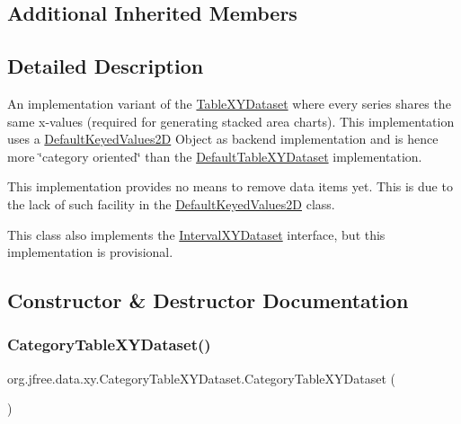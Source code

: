 \subsection*{Additional Inherited Members}


\subsection{Detailed Description}
An implementation variant of the \mbox{\hyperlink{interfaceorg_1_1jfree_1_1data_1_1xy_1_1_table_x_y_dataset}{Table\+X\+Y\+Dataset}} where every series shares the same x-\/values (required for generating stacked area charts). This implementation uses a \mbox{\hyperlink{classorg_1_1jfree_1_1data_1_1_default_keyed_values2_d}{Default\+Keyed\+Values2D}} Object as backend implementation and is hence more \char`\"{}category oriented\char`\"{} than the \mbox{\hyperlink{classorg_1_1jfree_1_1data_1_1xy_1_1_default_table_x_y_dataset}{Default\+Table\+X\+Y\+Dataset}} implementation. 

This implementation provides no means to remove data items yet. This is due to the lack of such facility in the \mbox{\hyperlink{classorg_1_1jfree_1_1data_1_1_default_keyed_values2_d}{Default\+Keyed\+Values2D}} class. 

This class also implements the \mbox{\hyperlink{interfaceorg_1_1jfree_1_1data_1_1xy_1_1_interval_x_y_dataset}{Interval\+X\+Y\+Dataset}} interface, but this implementation is provisional. 

\subsection{Constructor \& Destructor Documentation}
\mbox{\label{classorg_1_1jfree_1_1data_1_1xy_1_1_category_table_x_y_dataset_a05f2bc22c5ff51788de7254707687677}} 
\subsubsection{\texorpdfstring{Category\+Table\+X\+Y\+Dataset()}{CategoryTableXYDataset()}}
{\footnotesize\ttfamily org.\+jfree.\+data.\+xy.\+Category\+Table\+X\+Y\+Dataset.\+Category\+Table\+X\+Y\+Dataset (\begin{DoxyParamCaption}{ }\end{DoxyParamCaption})}


